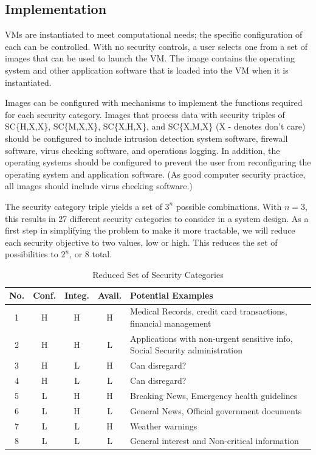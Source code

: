 \documentclass{sig-alternate}
\begin{document}
\subsection{Implementation}
VMs are instantiated to meet computational needs; the specific configuration of each can be controlled.  With no security controls, a user selects one from a set of images that can be used to launch the VM.  The image contains the operating system and other application software that is loaded into the VM when it is instantiated. 
 
Images can be configured with mechanisms to implement the functions required for each security category.  Images that process data with security triples of  SC\{H,X,X\}, SC\{M,X,X\}, SC\{X,H,X\}, and SC\{X,M,X\} (X - denotes don't care) should be configured to include intrusion detection system software, firewall software, virus checking software, and operations logging.  In addition, the operating systems should be configured to prevent the user from reconfiguring the operating system and application software.   (As good computer security practice, all images should include virus checking software.)

The security category triple yields a set of $3^{n}$ possible combinations.  With $n = 3$, this results in 27 different security categories to consider in a system design.  As a first step in simplifying the problem to make it more tractable, we will reduce each security objective to two values, low or high.  This reduces the set of possibilities to $2^{n}$, or 8 total.

\begin{table}
\begin{tabular}{|c|c|c|c|p{1.3in}|}
\hline
No. & Conf. & Integ. & Avail. & Potential Examples \\
\hline
1 & H & H & H & Medical Records, 
credit card transactions,
financial management \\
\hline
2 & H & H & L & Applications with non-urgent sensitive info, 
Social Security administration \\
\hline
3 & H & L & H & Can disregard? \\
\hline
4 & H & L & L & Can disregard? \\
\hline
5 & L & H & H & Breaking News, 
                Emergency health guidelines \\
\hline
6 & L & H & L & General News,
                Official government documents \\
\hline
7 & L & L & H & Weather warnings \\
\hline
8 & L & L & L & General interest and
                Non-critical information \\
\hline
\end{tabular} 
\caption{Reduced Set of Security Categories}
\end{table}
\end{document}
